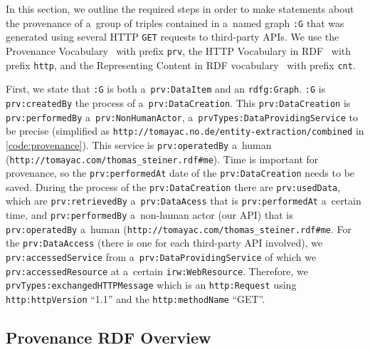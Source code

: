 In this section, we outline the required steps
in order to make statements about the provenance
of a~group of triples contained in a~named graph
\texttt{:G} that was generated using several HTTP \texttt{GET}
requests to third-party APIs.
We use the Provenance Vocabulary~\cite{hartig2012provenance} with
prefix \texttt{prv}, the HTTP Vocabulary in RDF~\cite{koch2011http}
with prefix \texttt{http}, and the Representing Content in RDF
vocabulary~\cite{koch2011content} with prefix \texttt{cnt}.

First, we state that \texttt{:G} is both a~\texttt{prv:DataItem}
and an \texttt{rdfg:Graph}.
\texttt{:G} is \texttt{prv:createdBy} the process of
a~\texttt{prv:DataCreation}.
This \texttt{prv:DataCreation} is \texttt{prv:performedBy}
a~\texttt{prv:NonHumanActor},
a~\texttt{prvTypes:DataProvidingService}
to be precise (simplified as
\texttt{http://tomayac.no.de/entity-extraction/combined}
in \autoref{code:provenance}).
This service is \texttt{prv:operatedBy} a~human
(\texttt{http://tomayac.com/thomas\_steiner.rdf\#me}).
Time is important for provenance,
so the \texttt{prv:performedAt} date of
the \texttt{prv:DataCreation}
needs to be saved.
During the process of the \texttt{prv:DataCreation}
there are \texttt{prv:usedData},
which are \texttt{prv:retrievedBy} a~\texttt{prv:DataAcess}
that is \texttt{prv:performedAt} a~certain time,
and \texttt{prv:performedBy} a~non-human actor
(our API) that is \texttt{prv:operatedBy}
a~human (\texttt{http://tomayac.com/thomas\_steiner.rdf\#me}.
For the \texttt{prv:DataAccess}
(there is one for each third-party API involved),
we \texttt{prv:accessedService} from
a~\texttt{prv:DataProvidingService} of which we
\texttt{prv:accessedResource} at
a~certain \texttt{irw:WebResource}.
Therefore, we \texttt{prvTypes:exchangedHTTPMessage} which is an
\texttt{http:Request} using \texttt{http:httpVersion} ``1.1''
and the \texttt{http:methodName} ``GET''.

\subsection{Provenance RDF Overview}

